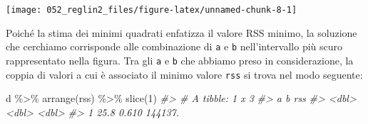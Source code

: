 \documentclass[
  10pt,
  italian,
  a4paper,
  extrafontsizes,onecolumn,openright
  ]{memoir}
\newenvironment{Shaded}{\begin{snugshade}}{\end{snugshade}}
\newcommand{\AttributeTok}[1]{\textcolor[rgb]{0.77,0.63,0.00}{#1}}
\newcommand{\CommentTok}[1]{\textcolor[rgb]{0.56,0.35,0.01}{\textit{#1}}}
\newcommand{\DecValTok}[1]{\textcolor[rgb]{0.00,0.00,0.81}{#1}}
\newcommand{\FloatTok}[1]{\textcolor[rgb]{0.00,0.00,0.81}{#1}}
\newcommand{\FunctionTok}[1]{\textcolor[rgb]{0.00,0.00,0.00}{#1}}
\newcommand{\NormalTok}[1]{#1}
\newcommand{\OtherTok}[1]{\textcolor[rgb]{0.56,0.35,0.01}{#1}}
\newcommand{\SpecialCharTok}[1]{\textcolor[rgb]{0.00,0.00,0.00}{#1}}
\newcommand{\StringTok}[1]{\textcolor[rgb]{0.31,0.60,0.02}{#1}}
\begin{document}
\begin{Shaded}
\end{Shaded}

\begin{center}\texttt{[image: 052\_reglin2\_files/figure-latex/unnamed-chunk-8-1]} \end{center}

Poiché la stima dei minimi quadrati enfatizza il valore RSS minimo, la soluzione che cerchiamo corrisponde alle combinazione di \texttt{a} e \texttt{b} nell'intervallo più scuro rappresentato nella figura. Tra gli \texttt{a} e \texttt{b} che abbiamo preso in considerazione, la coppia di valori a cui è associato il minimo valore \texttt{rss} si trova nel modo seguente:

\begin{Shaded}
\begin{Highlighting}[]
\NormalTok{d }\SpecialCharTok{\%\textgreater{}\%}
  \FunctionTok{arrange}\NormalTok{(rss) }\SpecialCharTok{\%\textgreater{}\%}
  \FunctionTok{slice}\NormalTok{(}\DecValTok{1}\NormalTok{)}
\CommentTok{\#\textgreater{} \# A tibble: 1 x 3}
\CommentTok{\#\textgreater{}       a     b     rss}
\CommentTok{\#\textgreater{}   \textless{}dbl\textgreater{} \textless{}dbl\textgreater{}   \textless{}dbl\textgreater{}}
\CommentTok{\#\textgreater{} 1  25.8 0.610 144137.}
\end{Highlighting}
\end{Shaded}
\end{document}
